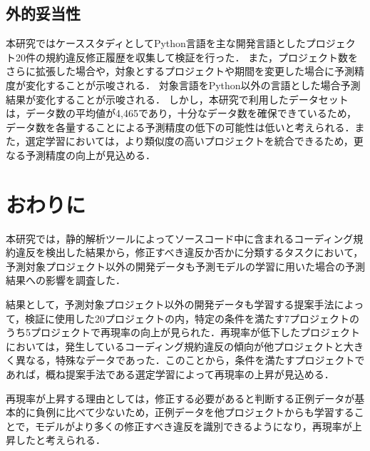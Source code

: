 \documentclass[paper]{ieicej}
\begin{document}


\subsection{外的妥当性}

本研究ではケーススタディとしてPython言語を主な開発言語としたプロジェクト20件の規約違反修正履歴を収集して検証を行った．
また，プロジェクト数をさらに拡張した場合や，対象とするプロジェクトや期間を変更した場合に予測精度が変化することが示唆される．
対象言語をPython以外の言語とした場合予測結果が変化することが示唆される．
しかし，本研究で利用したデータセットは，データ数の平均値が4,465であり，十分なデータ数を確保できているため，データ数を各量することによる予測精度の低下の可能性は低いと考えられる．また，選定学習においては，より類似度の高いプロジェクトを統合できるため，更なる予測精度の向上が見込める．

\section{おわりに}\label{chap:end}

本研究では，静的解析ツールによってソースコード中に含まれるコーディング規約違反を検出した結果から，修正すべき違反か否かに分類するタスクにおいて，予測対象プロジェクト以外の開発データも予測モデルの学習に用いた場合の予測結果への影響を調査した．

結果として，予測対象プロジェクト以外の開発データも学習する提案手法によって，検証に使用した20プロジェクトの内，特定の条件を満たす7プロジェクトのうち5プロジェクトで再現率の向上が見られた．再現率が低下したプロジェクトにおいては，発生しているコーディング規約違反の傾向が他プロジェクトと大きく異なる，特殊なデータであった．このことから，条件を満たすプロジェクトであれば，概ね提案手法である選定学習によって再現率の上昇が見込める．

再現率が上昇する理由としては，修正する必要があると判断する正例データが基本的に負例に比べて少ないため，正例データを他プロジェクトからも学習することで，モデルがより多くの修正すべき違反を識別できるようになり，再現率が上昇したと考えられる．
\end{document}
